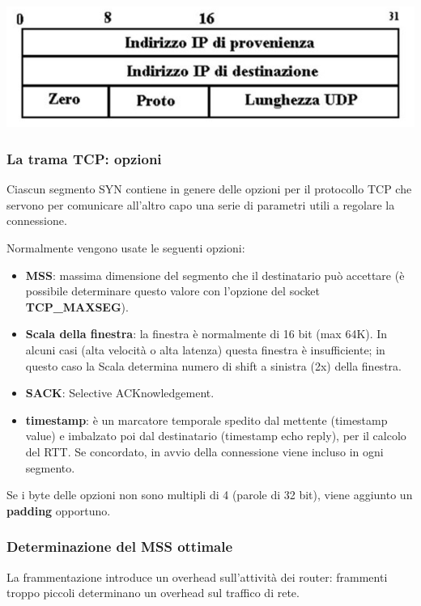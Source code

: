             \begin{center}
                \includegraphics[scale=0.4]{chapters/5/assets/schema_l.png}
            \end{center}

        \subsubsection{La trama TCP: opzioni}
            Ciascun segmento SYN contiene in genere delle opzioni per il protocollo TCP che servono per comunicare all'altro capo una serie di parametri utili a regolare la connessione.
        
            Normalmente vengono usate le seguenti opzioni:
            \begin{itemize}
                \item \textbf{MSS}: massima dimensione del segmento che il destinatario può accettare (è possibile determinare questo valore con l'opzione del socket \textbf{TCP\_MA\-XSEG}).
                \item \textbf{Scala della finestra}: la finestra è normalmente di 16 bit (max 64K). In alcuni casi (alta velocità o alta latenza) questa finestra è insufficiente; in questo caso la Scala determina numero di shift a sinistra (2x) della finestra.
                \item \textbf{SACK}: Selective ACKnowledgement.
                \item \textbf{timestamp}: è un marcatore temporale spedito dal mettente (timestamp value) e imbalzato poi dal destinatario (timestamp echo reply), per il calcolo del RTT. Se concordato, in avvio della connessione viene incluso in ogni segmento.
            \end{itemize}
            
            Se i byte delle opzioni non sono multipli di 4 (parole di 32 bit), viene aggiunto un \textbf{padding} opportuno.

        \subsubsection{Determinazione del MSS ottimale}
            La frammentazione introduce un overhead sull'attività dei router: frammenti troppo piccoli determinano un overhead sul traffico di rete.
        
